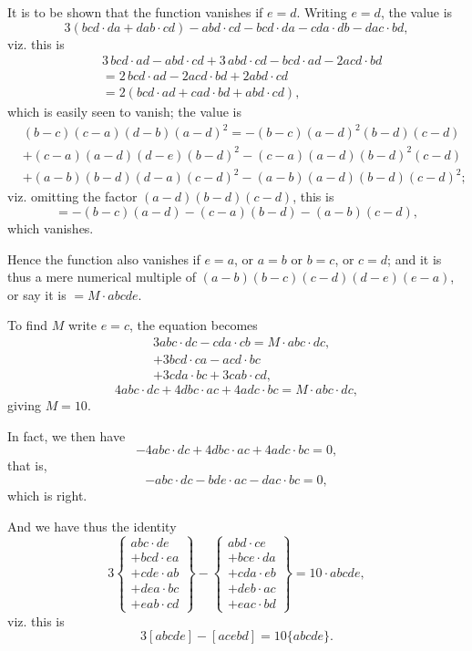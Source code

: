 \documentclass[11pt,a4paper]{book}
\begin{document}
It is to be shown that the function vanishes if $e = d$. Writing $e = d$, the value is
\[
3(bcd \cdot da + dab \cdot cd) - abd \cdot cd - bcd \cdot da - cda \cdot db - dac \cdot bd,
\]
viz. this is
\begin{align*}
&3\, bcd \cdot ad - abd \cdot cd + 3\, abd \cdot cd - bcd \cdot ad - 2acd \cdot bd \\
&= 2\, bcd \cdot ad - 2acd \cdot bd + 2abd \cdot cd \\
&= 2(bcd \cdot ad + cad \cdot bd + abd \cdot cd),
\end{align*}
which is easily seen to vanish; the value is
\begin{align*}
&(b - c)(c - a)(d - b)(a - d)^2 = -(b - c)(a - d)^2(b - d)(c - d) \\
&+ (c - a)(a - d)(d - e)(b - d)^2 - (c - a)(a - d)(b - d)^2(c - d) \\
&+ (a - b)(b - d)(d - a)(c - d)^2 - (a - b)(a - d)(b - d)(c - d)^2;
\end{align*}
viz. omitting the factor $(a - d)(b - d)(c - d)$, this is
\[
= -(b - c)(a - d) - (c - a)(b - d) - (a - b)(c - d),
\]
which vanishes.

Hence the function also vanishes if $e = a$, or $a = b$ or $b = c$, or $c = d$; and it is thus a mere numerical multiple of $(a - b)(b - c)(c - d)(d - e)(e - a)$, or say it is $= M \cdot abcde$.

To find $M$ write $e = c$, the equation becomes
\begin{align*}
&3abc \cdot dc - cda \cdot cb = M \cdot abc \cdot dc, \\
&+ 3bcd \cdot ca - acd \cdot bc \\
&+ 3cda \cdot bc + 3cab \cdot cd,
\end{align*}
\[
4abc \cdot dc + 4dbc \cdot ac + 4adc \cdot bc = M \cdot abc \cdot dc,
\]
giving $M = 10$.

In fact, we then have
\[
-4abc \cdot dc + 4dbc \cdot ac + 4adc \cdot bc = 0,
\]
that is,
\[
-abc \cdot dc - bde \cdot ac - dac \cdot bc = 0,
\]
which is right.

And we have thus the identity
\[
3\left\{\begin{array}{l}
abc \cdot de \\
+ bcd \cdot ea \\
+ cde \cdot ab \\
+ dea \cdot bc \\
+ eab \cdot cd
\end{array}\right\}
-
\left\{\begin{array}{l}
abd \cdot ce \\
+ bce \cdot da \\
+ cda \cdot eb \\
+ deb \cdot ac \\
+ eac \cdot bd
\end{array}\right\}
= 10 \cdot abcde,
\]
viz. this is
\[
3[abcde] - [acebd] = 10\{abcde\}.
\]
\end{document}
